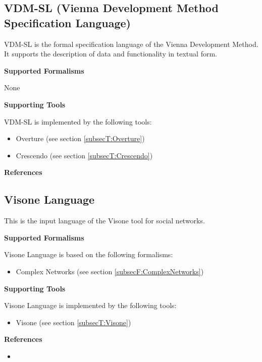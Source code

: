 \subsection{VDM-SL (Vienna Development Method Specification Language)}
\label{subsecL:VDM-SL}


VDM-SL is the formal specification language of the Vienna Development Method. It supports the description of data and functionality in textual form.

\textbf{Supported Formalisms}

None


\textbf{Supporting Tools}

VDM-SL is implemented by the following tools:
\begin{itemize}
	\item Overture (see section \ref{subsecT:Overture})
	\item Crescendo (see section \ref{subsecT:Crescendo})
\end{itemize}


\textbf{References}




\subsection{Visone Language}
\label{subsecL:VisoneLanguage}


This is the input language of the Visone tool for social networks.

\textbf{Supported Formalisms}

Visone Language is based on the following formalisms:
\begin{itemize}
	\item Complex Networks (see section \ref{subsecF:ComplexNetworks})
\end{itemize}


\textbf{Supporting Tools}

Visone Language is implemented by the following tools:
\begin{itemize}
	\item Visone (see section \ref{subsecT:Visone})
\end{itemize}


\textbf{References}
\begin{itemize}
	
\item {}
\end{itemize}



